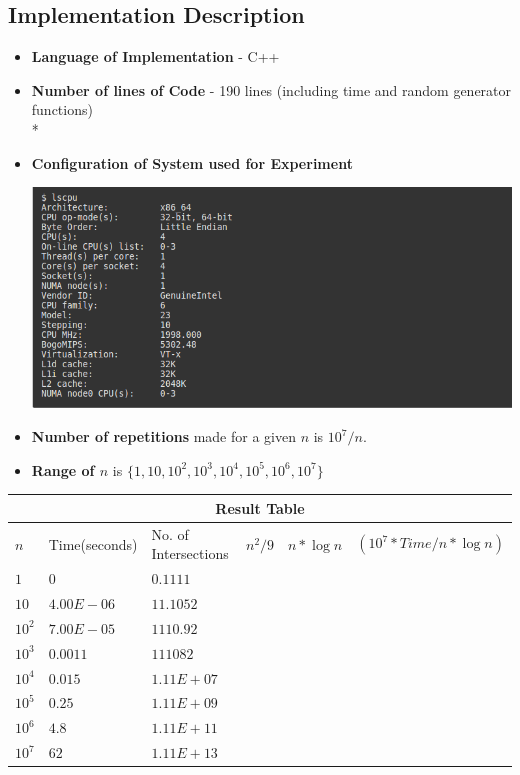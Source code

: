 \documentclass{article}
\begin{document}
\subsection{Implementation Description}
\begin{itemize}
\item {\bf Language of Implementation} - C++ 
\item {\bf Number of lines of Code} - 190 lines (including time and random generator functions)\\*
\item {\bf Configuration of System used for Experiment}
\begin{center}
\includegraphics[scale=0.5]{system_conf.png}
\end{center}
\item {\bf Number of repetitions} made for a given {\bf $n$} is {\bf $10^7/n$}. 
\item {\bf Range of $n$ } is {\bf $\{1,10,10^2, 10^3, 10^4, 10^5, 10^6, 10^7 \} $}
\end{itemize}
\hspace*{-2.5cm}\begin{tabular}{|p{1cm}|p{2.5cm}|p{2.5cm}|p{1.5cm}|p{1.5cm}|p{4cm}|}
 \hline
 \multicolumn{6}{|c|}{Result Table} \\
 \hline
 $n$   & Time(seconds) & No. of Intersections & $n^2/9$ &  $n *\log n $ & $(10^7 * Time/n* \log n)$\\
 \hline 
 $1$   	& $0$ 		& $0.1111$	& $ $ 	& $ $  	& $ $	\\
 \hline
 $10$  	& $4.00E-06$	& $11.1052$ & $ $	& $ $	& $ $	\\
 \hline
 $10^2$	& $7.00E-05$	& $1110.92$	& $ $	& $ $	& $ $	\\
 \hline
 $10^3$	& $0.0011$	& $111082$	&  	&	&	\\
 \hline
 $10^4$	& $0.015$  	& $1.11E+07$	&	&	&	\\
 \hline
 $10^5$	& $0.25$ 	& $1.11E+09$&	&	&	\\
 \hline
 $10^6$	& $4.8$		& $1.11E+11$&	&	&	\\
 \hline
 $10^7$	& $62$		& $1.11E+13$&	&	&	\\
 \hline
\end{tabular}
\end{document}
